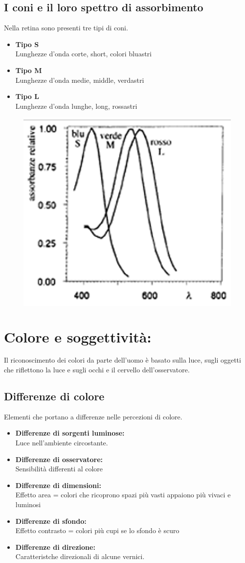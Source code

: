 \documentclass{report}
\begin{document}
	\subsection{I coni e il loro spettro di assorbimento}
	Nella retina sono presenti tre tipi di coni.
	\begin{itemize}
		\item \textbf{Tipo S}\\
		      Lunghezze d'onda corte, short, colori bluastri
		\item \textbf{Tipo M}\\
		      Lunghezze d'onda medie, middle, verdastri
		\item \textbf{Tipo L}\\
		      Lunghezze d'onda lunghe, long, rossastri
	\end{itemize}
	\begin{figure}[htp]
		\centering
		\includegraphics[width=0.5\linewidth]{assorbimento.png}
	\end{figure}
	\section{Colore e soggettività:}
	Il riconoscimento dei colori da parte dell'uomo è basato sulla luce, sugli oggetti che riflettono la luce e sugli occhi e il cervello dell'osservatore.
	\subsection{Differenze di colore}
	Elementi che portano a differenze nelle percezioni di colore.
	\begin{itemize}
		\item \textbf{Differenze di sorgenti luminose:}\\
		      Luce nell'ambiente circostante.
		\item \textbf{Differenze di osservatore:} \\
		      Sensibilità differenti al colore
		\item \textbf{Differenze di dimensioni:} \\
		      Effetto area = colori che ricoprono spazi più vasti appaiono più vivaci e luminosi
		\item \textbf{Differenze di sfondo:} \\
		      Effetto contrasto = colori più cupi se lo sfondo è scuro
		\item \textbf{Differenze di direzione:} \\
		      Caratteristche direzionali di alcune vernici.
	\end{itemize}
	
\end{document}
